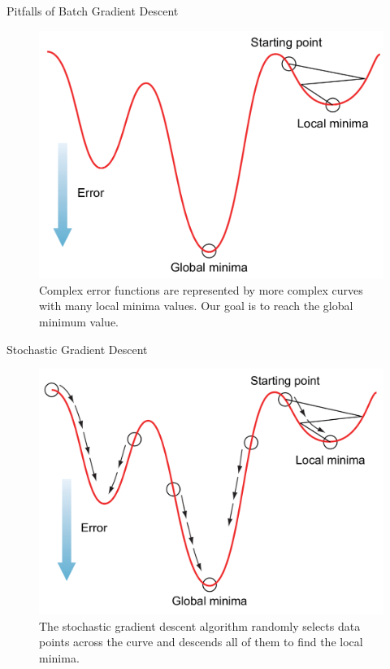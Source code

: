 \documentclass{beamer}
\begin{document}
\begin{frame}{Pitfalls of Batch Gradient Descent}
	\begin{figure}[ht]
	\centering
	\includegraphics[scale=0.25]{images/pitfalls}
	\caption{Complex error functions are represented by more complex curves with many local minima values. Our goal is to reach the global minimum value.}
\end{figure}									
\end{frame}

\begin{frame}{Stochastic Gradient Descent}
	\begin{figure}[ht]
	\centering
	\includegraphics[scale=0.2]{images/stochastic-gd}
	\caption{The stochastic gradient descent algorithm randomly selects data points across the curve and descends all of them to find the local minima.}
\end{figure}	
\end{frame}
\end{document}

